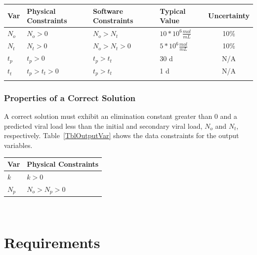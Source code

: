 \documentclass[12pt]{article}
\begin{document}
\begin{center}

\begin{table}[!h]
  \caption{Input Variables} \label{TblInputVar}
  \renewcommand{\arraystretch}{1.2}
\noindent \begin{longtable*}{l l l l c} 
  \toprule
  \textbf{Var} & \textbf{Physical Constraints} & \textbf{Software Constraints} &
                             \textbf{Typical Value} & \textbf{Uncertainty}\\
  \midrule 
  $N_o$ & $N_o > 0$ & $N_o > N_t $ & $10*10^6 \frac{mol}{mL}$ & 
10\%\\
  $N_t$ & $N_t > 0$ & $N_o > N_t > 0$ & $5*10^6 \frac{mol}{mL}$ & 10\%\\
  $t_{p}$ &  $t_{p} > 0$ &  $t_{p}> t_{t} $ & 30 d & N/A\\
  $t_{t}$ &  $t_{p} > t_{t} > 0$ &  $t_{p}> t_{t} $ & 1 d & N/A\\
  \\
  \bottomrule
\end{longtable*}
\end{table}

\end{center}


\subsubsection{Properties of a Correct Solution} \label{sec_CorrectSolution}

\noindent
A correct solution must exhibit an elimination constant greater than 0 and a predicted viral load less than the initial and secondary viral load, $N_o$ and $N_t$, respectively. 
Table~\ref{TblOutputVar} shows the data constraints for the output variables. 


\begin{table}[!h]
\caption{Output Variables} \label{TblOutputVar}
\renewcommand{\arraystretch}{1.2}
\noindent \begin{longtable*}{l l} 
  \toprule
  \textbf{Var} & \textbf{Physical Constraints} \\
  \midrule 
  $k$ & $k > 0 $ 
  \\ 
  $N_p$ & $N_o > N_p > 0 $ 
   \\
  \bottomrule
\end{longtable*}
\end{table}

~\newpage
\section{Requirements}
\end{document}
